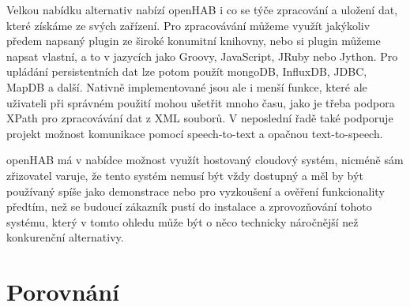 Velkou nabídku alternativ nabízí openHAB i co se týče zpracování a uložení dat, které získáme ze svých zařízení. Pro zpracovávání můžeme využít jakýkoliv předem napsaný plugin ze široké konumitní knihovny, nebo si plugin můžeme napsat vlastní, a to v jazycích jako Groovy, JavaScript, JRuby nebo Jython. Pro upládání persistentních dat lze potom použít mongoDB, InfluxDB, JDBC, MapDB a další. Nativně implementované jsou ale i menší funkce, které ale uživateli při správném použití mohou ušetřit mnoho času, jako je třeba podpora XPath pro zpracovávání dat z XML souborů. V neposlední řadě také podporuje projekt možnost komunikace pomocí speech-to-text a opačnou text-to-speech.

openHAB má v nabídce možnost využít hostovaný cloudový systém, nicméně sám zřizovatel varuje, že tento systém nemusí být vždy dostupný a měl by být používaný spíše jako demonstrace nebo pro vyzkoušení a ověření funkcionality předtím, než se budoucí zákazník pustí do instalace a zprovozňování tohoto systému, který v tomto ohledu může být o něco technicky náročnější než konkurenční alternativy.



\section{Porovnání}
